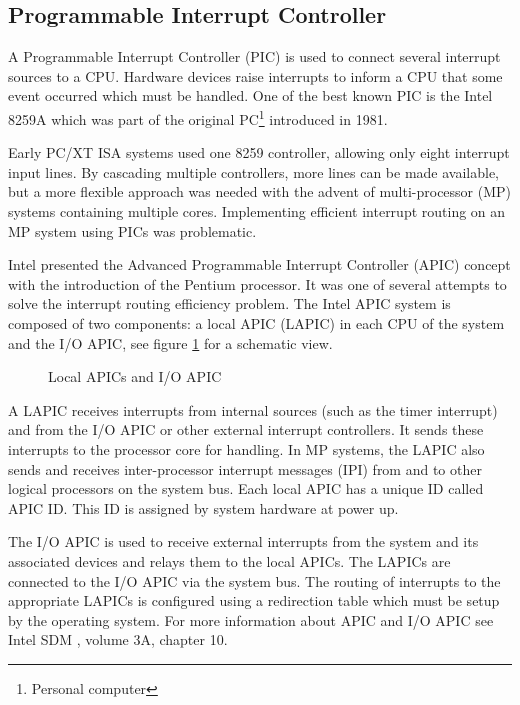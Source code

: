 \subsection{Programmable Interrupt Controller}\label{subsec:apic}
A Programmable Interrupt Controller (PIC) is used to connect several
interrupt sources to a CPU. Hardware devices raise interrupts to inform a CPU
that some event occurred which must be handled. One of the best known PIC is
the Intel 8259A which was part of the original PC\footnote{Personal
computer} introduced in 1981.

Early PC/XT ISA systems used one 8259 controller, allowing only
eight interrupt input lines. By cascading multiple controllers, more lines can
be made available, but a more flexible approach was needed with the advent of
multi-processor (MP) systems containing multiple cores. Implementing
efficient interrupt routing on an MP system using PICs was problematic.

Intel presented the Advanced Programmable Interrupt Controller
(APIC) concept with the introduction of the Pentium processor. It
was one of several attempts to solve the interrupt routing efficiency problem.
The Intel APIC system is composed of two components: a local APIC
(LAPIC) in each CPU of the system and the I/O APIC,
see figure \ref{fig:apic} for a schematic view.

\begin{figure}[h]
	\centering
	
	\caption{Local APICs and I/O APIC}
	\label{fig:apic}
\end{figure}

A LAPIC receives interrupts from internal sources (such as the timer interrupt)
and from the I/O APIC or other external interrupt controllers. It sends these
interrupts to the processor core for handling. In MP systems, the LAPIC also
sends and receives inter-processor interrupt messages (IPI) from and
to other logical processors on the system bus. Each local APIC has a unique ID
called APIC ID. This ID is assigned by system hardware at power
up.

The I/O APIC is used to receive external interrupts from the system and its
associated devices and relays them to the local APICs. The LAPICs are connected
to the I/O APIC via the system bus. The routing of interrupts to the appropriate
LAPICs is configured using a redirection table which must be setup by the
operating system. For more information about APIC and I/O APIC see Intel SDM
\cite{IntelSDM}, volume 3A, chapter 10.

